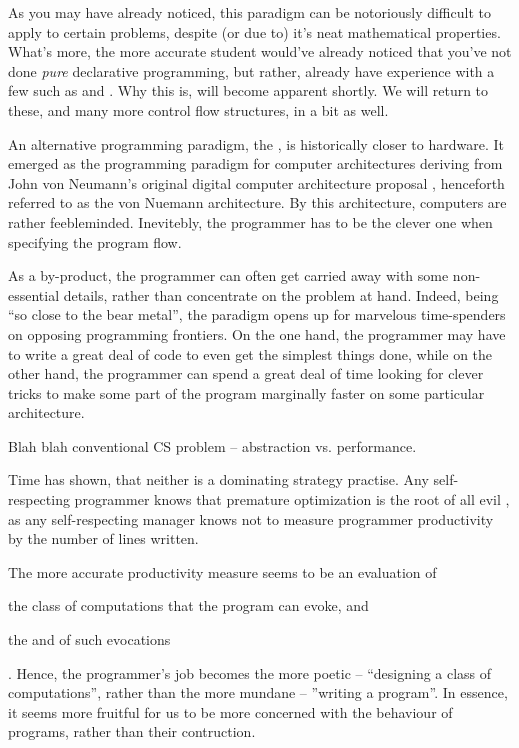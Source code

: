 As you may have already noticed, this paradigm can be notoriously difficult to
apply to certain problems, despite (or due to) it's neat mathematical
properties.  What's more, the more accurate student would've already noticed
that you've not done \emph{pure} declarative programming, but rather, already
have experience with a few  such as  and
 . Why this is, will become apparent shortly. We
will return to these, and many more control flow structures, in a bit as well.

An alternative programming paradigm, the , is historically
closer to hardware. It emerged as the programming paradigm for computer
architectures deriving from John von Neumann's original digital computer
architecture proposal \cite{von-neumann}, henceforth referred to as the von
Nuemann architecture. By this architecture, computers are rather feebleminded.
Inevitebly, the programmer has to be the clever one when specifying the program
flow.

As a by-product, the programmer can often get carried away with some
non-essential details, rather than concentrate on the problem at hand. Indeed,
being ``so close to the bear metal'', the paradigm opens up for marvelous
time-spenders on opposing programming frontiers. On the one hand, the
programmer may have to write a great deal of code to even get the simplest
things done, while on the other hand, the programmer can spend a great deal of
time looking for clever tricks to make some part of the program marginally
faster on some particular architecture.

Blah blah conventional CS problem -- abstraction vs. performance.

Time has shown, that neither is a dominating strategy practise. Any
self-respecting programmer knows that premature optimization is the root of all
evil \cite{knuth-goto}, as any self-respecting manager knows not to measure
programmer productivity by the number of lines written.


The more accurate productivity measure seems to be an evaluation of
\begin{inparaenum}[(1)] \item the class of computations that the program can
evoke, and \item the  and   of such
evocations\end{inparaenum}. Hence, the programmer's job becomes the more poetic
-- ``designing a class of computations'', rather than the more mundane --
''writing a program''. In essence, it seems more fruitful for us to be more
concerned with the behaviour of programs, rather than their contruction.

